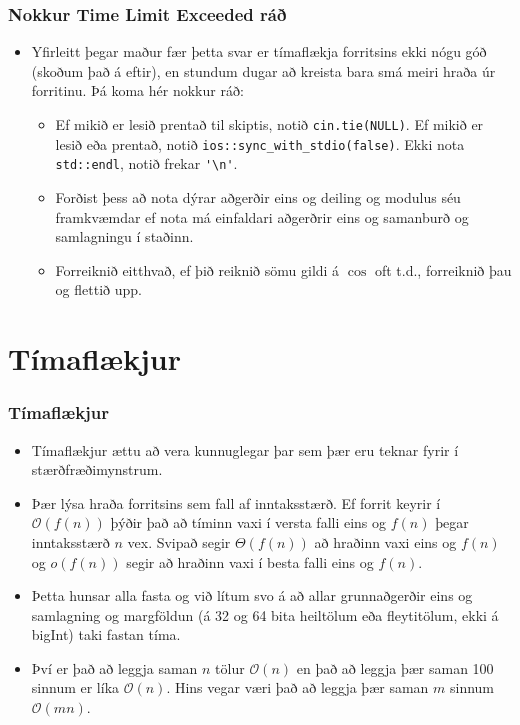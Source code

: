 \documentclass{beamer}
\begin{document}
\begin{frame}[fragile]
\frametitle{Nokkur Time Limit Exceeded ráð}

\begin{itemize}

\item<1-> Yfirleitt þegar maður fær þetta svar er tímaflækja forritsins ekki nógu góð (skoðum það á eftir), en stundum dugar að kreista bara smá meiri hraða úr forritinu. Þá koma hér nokkur ráð:

\begin{itemize}

\item<2-> Ef mikið er lesið prentað til skiptis, notið \texttt{cin.tie(NULL)}. Ef mikið er lesið eða prentað, notið \texttt{ios::sync\_with\_stdio(false)}. Ekki nota \texttt{std::endl}, notið frekar \verb|'\n'|.

\item<3-> Forðist þess að nota dýrar aðgerðir eins og deiling og modulus séu framkvæmdar ef nota má einfaldari aðgerðrir eins og samanburð og samlagningu í staðinn.

\item<4-> Forreiknið eitthvað, ef þið reiknið sömu gildi á $\cos$ oft t.d., forreiknið þau og flettið upp.

\end{itemize}

\end{itemize}

\end{frame}

\section[Tímaflækjur]{Tímaflækjur}

\begin{frame}
\frametitle{Tímaflækjur}

\begin{itemize}

\item<1-> Tímaflækjur ættu að vera kunnuglegar þar sem þær eru teknar fyrir í stærðfræðimynstrum.

\item<2-> Þær lýsa hraða forritsins sem fall af inntaksstærð. Ef forrit keyrir í $\mathcal{O}(f(n))$ þýðir það að tíminn vaxi í versta falli eins og $f(n)$ þegar inntaksstærð $n$ vex. Svipað segir $\Theta(f(n))$ að hraðinn vaxi eins og $f(n)$ og $o(f(n))$ segir að hraðinn vaxi í besta falli eins og $f(n)$.

\item<3-> Þetta hunsar alla fasta og við lítum svo á að allar grunnaðgerðir eins og samlagning og margföldun (á 32 og 64 bita heiltölum eða fleytitölum, ekki á bigInt) taki fastan tíma.

\item<4-> Því er það að leggja saman $n$ tölur $\mathcal{O}(n)$ en það að leggja þær saman 100 sinnum er líka $\mathcal{O}(n)$. Hins vegar væri það að leggja þær saman $m$ sinnum $\mathcal{O}(mn)$.

\end{itemize}

\end{frame}
\end{document}
